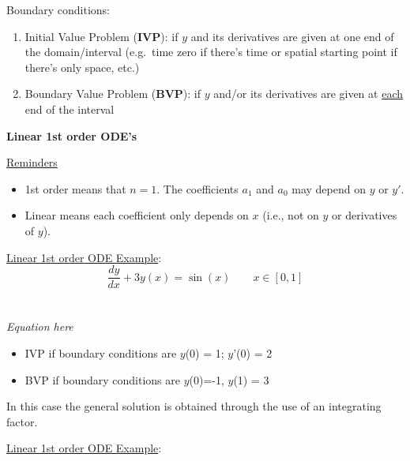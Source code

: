 \documentclass[12pt, answers]{exam}
\begin{document}
Boundary conditions:
\begin{enumerate}
\item Initial Value Problem (\textbf{IVP}): if $y$ and its derivatives are given at one end of the domain/interval (e.g.\ time zero if there's time or spatial starting point if there's only space, etc.)
\item Boundary Value Problem (\textbf{BVP}): if $y$ and/or its derivatives are given at \underline{each} end of the interval
\end{enumerate}

\vspace*{1em}
\textbf{Linear 1st order ODE's}

\underline{Reminders}
\begin{itemize}
\item 1st order means that $n=1$. The  coefficients $a_1$ and $a_0$ may depend on $y$ or $y'$.
\item Linear means each coefficient only depends on $x$ (i.e., not on $y$ or derivatives of $y$).
\end{itemize}

\underline{Linear 1st order ODE Example}:
\ifprintanswers
\begin{equation}
\frac{dy}{dx} + 3y(x) = \sin(x) \qquad x \in [0, 1] \nonumber
\end{equation}
\else
 \\ \\ 
 \hspace*{8em}\textit{Equation here}
\fi
%
%
\begin{itemize}
\item IVP if boundary conditions are $y$(0) = 1; $y$'(0) = 2
\item BVP if boundary conditions are $y$(0)=-1, $y$(1) = 3 
\end{itemize}
%
In this case the general solution is obtained through the use of an integrating factor.

\vspace*{1em}
\noindent \underline{Linear 1st order ODE Example}:
\end{document}
